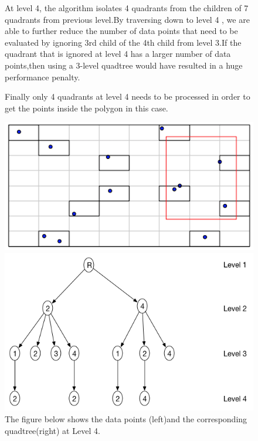 \documentclass{article}
\begin{document}
\begin{figure}[H]
At level 4, the algorithm isolates 4 quadrants from the children of 7 quadrants from previous level.By traversing down to level 4 , we are able to further reduce the number of data points that need to be evaluated by ignoring 3rd child of the 4th child from level 3.If the quadrant that is ignored at level 4 has a larger number of data points,then using a 3-level quadtree would have resulted in a huge performance penalty.

Finally only 4 quadrants at level 4 needs to be processed in order to get the points inside the polygon in this case.

  \centering
  \begin{minipage}[b]{0.35\textwidth}
    \includegraphics[width=\textwidth]{2Quad_4}  
  \end{minipage}
  \hfill
  \begin{minipage}[b]{0.6\textwidth}
    \includegraphics[width=\textwidth]{2Quad_4_tree}
  \end{minipage}
  \caption{The figure below shows the data points (left)and the corresponding quadtree(right) at Level 4.}
\end{figure}
\end{document}
